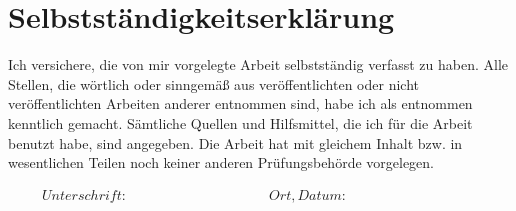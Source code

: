\section*{Selbstständigkeitserklärung}

\vspace{1cm}
Ich versichere, die von mir vorgelegte Arbeit selbstständig verfasst zu haben. Alle Stellen, die wörtlich oder sinngemäß aus veröffentlichten oder nicht veröffentlichten Arbeiten anderer entnommen sind, 
habe ich als entnommen kenntlich gemacht. Sämtliche Quellen und Hilfsmittel, die ich für die Arbeit benutzt habe, sind angegeben. Die Arbeit hat mit gleichem Inhalt bzw. in wesentlichen 
Teilen noch keiner anderen Prüfungsbehörde vorgelegen.



\begin{displaymath}
\begin{array}{ll}
Unterschrift:~~~~~~~~~~~~~~~~~~~~~~~~~~~~~~~~~~~~~~~~~~
& Ort, Datum:~~~~~~~~~~~~~~~~~~~~~~~~~~~~~~~~~~~~~~~~~~
\end{array}
\end{displaymath}
